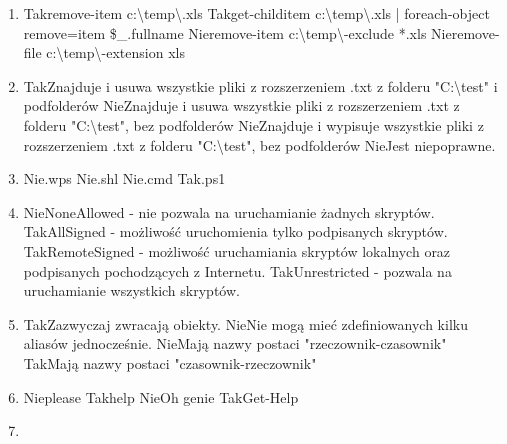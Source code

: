 \begin{enumerate}
		{Tak}{Znajdziemy liczbę plików i ich całkowity rozmiar w folderze C:\textbackslash Work oraz w podfolderach.}%
		{Nie}{Wypiszemy zawartość folderu C:\textbackslash Work.}%
		{Nie}{Wypiszemy największy plik z folderu C:\textbackslash Work.}%
		{Nie}{Jest to niepoprawna składnia.}
		\item {}%
		{Tak}{remove-item c:\textbackslash temp\textbackslash *.xls}%
		{Tak}{get-childitem c:\textbackslash temp\textbackslash *.xls | foreach-object { remove=item \$\_.fullname }}%
		{Nie}{remove-item c:\textbackslash temp\textbackslash * -exclude *.xls}%
		{Nie}{remove-file c:\textbackslash temp\textbackslash * -extension xls}
		\item {}%
		{Tak}{Znajduje i usuwa wszystkie pliki z rozszerzeniem .txt z folderu "C:\textbackslash test" i podfolderów}%
		{Nie}{Znajduje i usuwa wszystkie pliki z rozszerzeniem .txt z folderu "C:\textbackslash test", bez podfolderów}%
		{Nie}{Znajduje i wypisuje wszystkie pliki z rozszerzeniem .txt z folderu "C:\textbackslash test", bez podfolderów}%
		{Nie}{Jest niepoprawne.}
		\newpage
		\item {}%
		{Nie}{.wps}%
		{Nie}{.shl}%
		{Nie}{.cmd}%
		{Tak}{.ps1}
		\item {}%
		{Nie}{NoneAllowed - nie pozwala na uruchamianie żadnych skryptów.}%
		{Tak}{AllSigned - możliwość uruchomienia tylko podpisanych skryptów.}%
		{Tak}{RemoteSigned - możliwość uruchamiania skryptów lokalnych oraz podpisanych pochodzących z Internetu.}%
		{Tak}{Unrestricted - pozwala na uruchamianie wszystkich skryptów.}
		\item {}%
		{Tak}{Zazwyczaj zwracają obiekty.}%
		{Nie}{Nie mogą mieć zdefiniowanych kilku aliasów jednocześnie.}%
		{Nie}{Mają nazwy postaci "rzeczownik-czasownik"}%
		{Tak}{Mają nazwy postaci "czasownik-rzeczownik"}
		\item {}%
		{Nie}{please}%
		{Tak}{help}%
		{Nie}{Oh genie}%
		{Tak}{Get-Help}
		\item {}%

\end{enumerate}
